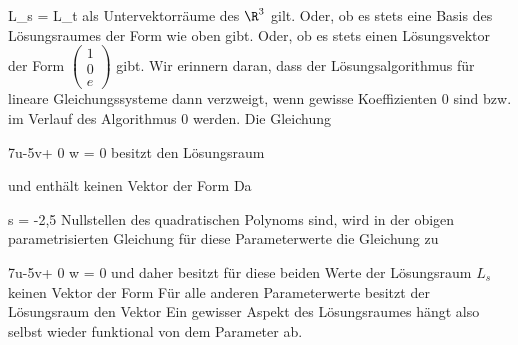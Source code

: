 \mavergleichskette
{\vergleichskette
{L_s
}
{ = }{L_t
}
{  }{
}
{    }{
}
{   }{
}
}
{}{}{}
als Untervektorräume des $\R^3$ gilt. Oder, ob es stets eine Basis des Lösungsraumes der Form
 wie oben gibt. Oder, ob es stets einen Lösungsvektor der Form $\begin{pmatrix}  1 \\ 0\\ e   \end{pmatrix}$ gibt. Wir erinnern daran, dass der Lösungsalgorithmus für lineare Gleichungssysteme
 {} {}
dann verzweigt, wenn gewisse Koeffizienten $0$ sind bzw. im Verlauf des Algorithmus $0$ werden. Die Gleichung

\mavergleichskettedisp
{\vergleichskette
{ 7u-5v+ 0  w
}
{ =} { 0
}
{ } {
}
{ } {
}
{ } {
}
}
{}{}{}
besitzt den Lösungsraum

und enthält keinen Vektor der Form
 Da

\mavergleichskette
{\vergleichskette
{s
}
{ = }{ -2,5
}
{  }{
}
{    }{
}
{   }{
}
}
{}{}{}
Nullstellen des quadratischen Polynoms
 sind, wird in der obigen parametrisierten Gleichung für diese Parameterwerte die Gleichung zu

\mavergleichskette
{\vergleichskette
{ 7u-5v+ 0  w
}
{ = }{ 0
}
{  }{
}
{    }{
}
{   }{
}
}
{}{}{}
und daher besitzt für diese beiden Werte der Lösungsraum $L_s$ keinen Vektor der Form
 Für alle anderen Parameterwerte besitzt der Lösungsraum den Vektor
 Ein gewisser Aspekt des Lösungsraumes hängt also selbst wieder funktional von dem Parameter ab.

